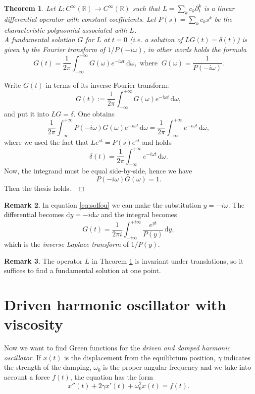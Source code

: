 \documentclass[a4paper,11pt]{article}	%
\theoremstyle{classicthm}
\newtheorem{theorem}{Theorem}[section]
\theoremstyle{definition}
\theoremstyle{definition}
\newtheorem{oss}[theorem]{Remark}
\def\Proof{{\medbreak\noindent{\textbf{Proof.} }}}
\def\endproof{~\hfill $\Box$\\}
\def\mR{{\mathbb R}}
\newcommand{\dd}{\mathrm d}
\begin{document}
\begin{theorem}
	\label{theorem:1}
	Let $L:C^\infty(\mR)\to C^\infty(\mR)$ such that $L=\sum_k c_k\partial_t^k$ is a linear differential operator with constant coefficients. Let $P(s)=\sum_k c_k s^k$ be the characteristic polynomial associated with $L$.\\ A fundamental solution $G$ for $L$ at $t=0$ (i.e. a solution of $LG(t)=\delta(t)$) is given by the \emph{Fourier transform} of $1/P(-i\omega)$, in other words holds the formula
	\begin{equation}
	G(t)=\frac{1}{2\pi}\int_{-\infty}^{+\infty} G(\omega)e^{-i\omega t}\,\dd\omega, \text{ where }\ G(\omega)=\frac1{P(-i\omega)}.
	\label{eq:solfou}
	\end{equation}
\end{theorem}
\Proof Write $G(t)$ in terms of its inverse Fourier transform:
\[	G(t):=\frac1{2\pi}\int_{-\infty}^{+\infty}G(\omega)e^{-i\omega t}\,\dd\omega,		\]
and put it into $LG=\delta$. One obtains
\[	\frac1{2\pi}\int_{-\infty}^{+\infty}P(-i\omega) G(\omega)e^{-i\omega t}\,\dd\omega=\frac1{2\pi}\int_{-\infty}^{+\infty}e^{-i\omega t}\,\dd\omega,		\]
where we used the fact that $Le^{st}=P(s)e^{st}$ and holds
\[	\delta(t)=\frac1{2\pi}\int_{-\infty}^{+\infty}e^{-i\omega t}\,\dd\omega.		\]
Now, the integrand must be equal side-by-side, hence we have
\[	P(-i\omega)G(\omega)=1.			\]
Then the thesis holds.
\endproof

\begin{oss}
	In equation \eqref{eq:solfou} we can make the substitution $y=-i\omega$. The differential becomes $\dd y=-i\dd\omega$ and the integral becomes
	\[G(t)=\frac{1}{2\pi i}\int_{-i\infty}^{+i\infty}\frac{e^{y t}}{P(y)}\,\dd y,\]
	which is the \emph{inverse Laplace transform} of $1/P(y)$.
\end{oss}

\begin{oss}
	The operator $L$ in Theorem \ref{theorem:1} is invariant under translations, so it suffices to find a fundamental solution at one point.
\end{oss}


\section{Driven harmonic oscillator with viscosity}

Now we want to find Green functions for the \emph{driven and damped harmonic oscillator}. If $x(t)$ is the displacement from the equilibrium position, $\gamma$ indicates the strength of the damping, $\omega_0$ is the proper angular frequency and we take into account a force $f(t)$, the equation has the form
\begin{equation}
	x''(t)+2\gamma x'(t)+\omega_0^2 x(t)=f(t).
	\label{eq:forceddamped}
\end{equation}
\end{document}
